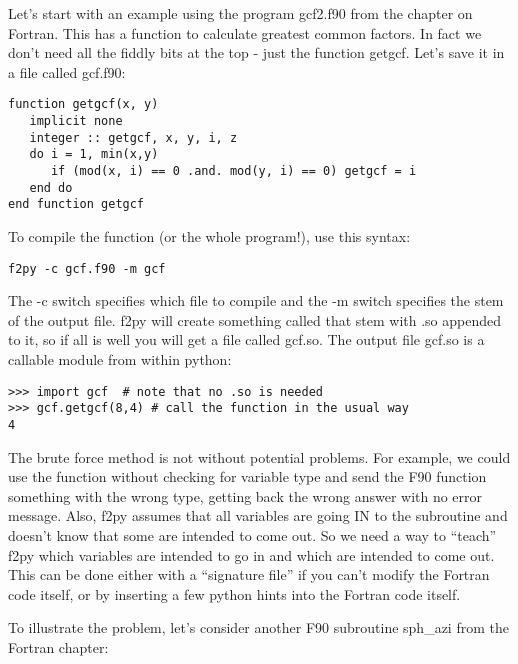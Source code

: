 {Let's start with an example using  the program {\color{blue}gcf2.f90}  from the chapter on Fortran.  This  has a function to calculate greatest common factors.  In fact we don't need all the fiddly bits at the top - just the function {\color{blue}getgcf}.  Let's save it  in a file called {\color{blue}gcf.f90}:


{\singlespacing \color{blue} \begin{verbatim}
function getgcf(x, y) 
   implicit none
   integer :: getgcf, x, y, i, z
   do i = 1, min(x,y)
      if (mod(x, i) == 0 .and. mod(y, i) == 0) getgcf = i
   end do
end function getgcf
\end{verbatim}}

To compile the function (or the whole program!),  use this syntax:

{\singlespacing \color{blue} \begin{verbatim}
f2py -c gcf.f90 -m gcf
\end{verbatim}}

\noindent The {\color{blue}-c} switch specifies which file to compile and the {\color{blue}-m} switch specifies the stem of the output file.  {\color{blue}f2py} will create something called that stem with  {\color{blue}.so} appended to it, so if all is well you will get a file called {\color{blue}gcf.so}.  
The output file {\color{blue}gcf.so}  is a callable module from within python:

{\singlespacing \color{blue} \begin{verbatim}
>>> import gcf  # note that no .so is needed
>>> gcf.getgcf(8,4) # call the function in the usual way
4
\end{verbatim}}


The brute force method is not without potential problems.  For example, we could use the function without checking for variable type and send the F90 function something with  the wrong type,  getting back the wrong answer with no error message. Also, {\color{blue}f2py}  assumes that all variables are going IN to the subroutine and doesn't know that some are intended to come out.  
 So we need a way to ``teach'' {\color{blue}f2py}  which variables are intended to go in and which are intended to come out.
This can be done either with a ``signature file'' if you can't modify the Fortran code itself, or by inserting a few python hints into the Fortran code itself.

To illustrate the problem, let's consider  another F90 subroutine {\color{blue}sph\_azi} from the Fortran chapter:


}
